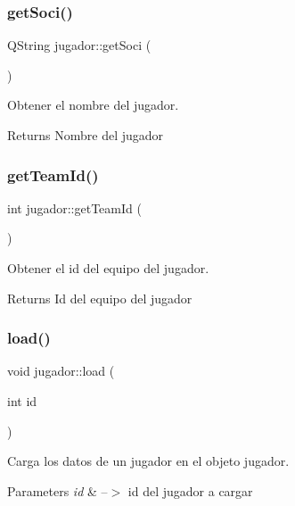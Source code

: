 \subsubsection{\texorpdfstring{get\+Soci()}{getSoci()}}
{\footnotesize\ttfamily Q\+String jugador\+::get\+Soci (\begin{DoxyParamCaption}{ }\end{DoxyParamCaption})}



Obtener el nombre del jugador. 

\begin{DoxyReturn}{Returns}
Nombre del jugador 
\end{DoxyReturn}
\mbox{\label{classjugador_a188b5459eed3f7f09b49232d0d674050}} 
\subsubsection{\texorpdfstring{get\+Team\+Id()}{getTeamId()}}
{\footnotesize\ttfamily int jugador\+::get\+Team\+Id (\begin{DoxyParamCaption}{ }\end{DoxyParamCaption})}



Obtener el id del equipo del jugador. 

\begin{DoxyReturn}{Returns}
Id del equipo del jugador 
\end{DoxyReturn}
\mbox{\label{classjugador_a9b57bb55fbd19cf2a1fee8397eeb0135}} 
\subsubsection{\texorpdfstring{load()}{load()}}
{\footnotesize\ttfamily void jugador\+::load (\begin{DoxyParamCaption}\item[{int}]{id }\end{DoxyParamCaption})}



Carga los datos de un jugador en el objeto jugador. 


\begin{DoxyParams}{Parameters}
{\em id} & --$>$ id del jugador a cargar \\
\hline
\end{DoxyParams}
\mbox{\label{classjugador_af56aa410ca759cb4e3548af92de007b0}} 
